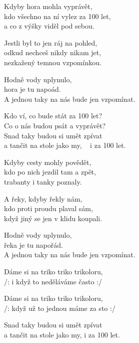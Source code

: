 
\pagestyle{empty}

\vspace{-2 pt}
\ve{}
Kdyby hora mohla vyprávět,\\
kdo všechno na ní vylez za 100 let,\\
a co z výšky viděl pod sebou.

\vspace{-2 pt}
\ve{}
Jestli byl to jen ráj na pohled,\\
odkud nechceš nikdy nikam jet,\\
nezkažený temnou vzpomínkou.

\vspace{-2 pt}
\re{*:}
Hodně vody uplynulo,\\
hora je tu napoád.\\
A jednou taky na nás bude jen vzpomínat.

\vspace{-2 pt}
\cho{}
Kdo ví, co bude stát za 100 let?\\
Co o nás budou psát  a vyprávět?\\
Snad taky budou si umět zpívat\\
a tančit na stole jako my, \  i za 100 let.

\vspace{-2 pt}
\ve{}
Kdyby cesty mohly povědět,\\
kdo po nich jezdil tam a zpět,\\
trabanty i tanky poznaly.

\vspace{-2 pt}
\ve{}
A řeky, kdyby řekly nám,\\
kdo proti proudu plaval sám,\\
když jiný se jen v klidu koupali.

\vspace{-2 pt}
\re{*:}
Hodně vody uplynulo,\\
řeka je tu napořád.\\
A jednou taky na nás bude jen vzpomínat.

\vspace{-2 pt}
\cho{}

\vspace{-2 pt}
\ve{}
Dáme si na triko triko trikoloru,\\
/: i když to neděláváme často :/

\ve{}
Dáme si na triko triko trikoloru,\\
/: když už to jednou máme za sto :/

\vspace{-2 pt}
\cho{}

\vspace{-2 pt}
\re{+}
Snad taky budou si umět zpívat \\
a tančit na stole jako my, i za 100 let.

\esong
\restoregeometry{}
\pagestyle{plain}